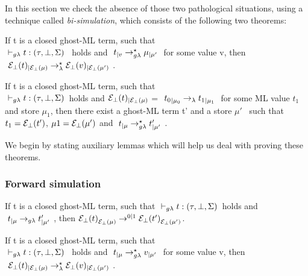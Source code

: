 

In this section we check the absence of those two pathological situations,
using a technique called \textit{bi-simulation}, which consists of 
the following two theorems:

\begin{theorem}
If t is a closed ghost-ML term, such that\\ 
$\typrule{t}{\tau}{\bot}{\Sigma}$ ~holds and $~t_{|v} \rightarrow_{g\lambda}^{\star} \mu_{|\mu'} ~$ 
for some value v, then\\ 
$~\mathcal{E}_{\bot}(t)_{|\mathcal{E}_{\bot}(\mu)} \rightarrow_{\lambda}^{\star} \mathcal{E}_{\bot}(v)_{|\mathcal{E}_{\bot}(\mu')} ~$.
\end{theorem}

\begin{theorem}
If t is a closed ghost-ML term, such that 
\\ $\typrule{t}{\tau}{\bot}{\Sigma}$~holds and 
$\mathcal{E}_{\bot}(t)_{|\mathcal{E}_{\bot}(\mu)}$ = $~{t_0}_{|{\mu_0}} \rightarrow_{\lambda} {t_{1}}_{|\mu_1} ~$ 
for some ML value $t_1$ and store $\mu_1$, 
then there exist a ghost-ML term t' and a store $\mu'$~
such that $t_1 =\mathcal{E}_{\bot}(t')$, $\mu1 = \mathcal{E}_{\bot}(\mu')$ and 
$~t_{|\mu} \rightarrow_{g\lambda}^{\star} t'_{|\mu'} ~$.
\end{theorem}

We begin by stating auxiliary lemmas which will help us deal with proving these theorems.
 
\subsubsection{Forward simulation}

\begin{lemma}
If t is a closed ghost-ML term, such that $\typrule{t}{\tau}{\bot}{\Sigma}$~holds 
and $~t_{|\mu} \rightarrow_{g\lambda} t'_{|\mu'} ~$, then 
${\mathcal{E}_{\bot}(t)}_{\mathcal{E}_{\bot}(\mu)} \rightarrow^{0|1} {\mathcal{E}_{\bot}(t')}_{\mathcal{E}_{\bot}(\mu')}$.
\end{lemma}







\begin{theorem}
If t is a closed ghost-ML term, such that\\ 
$\typrule{t}{\tau}{\bot}{\Sigma}$ ~holds and $~t_{|\mu} \rightarrow_{g\lambda}^{\star} v_{|\mu'} ~$ 
for some value v, then\\ 
$~\mathcal{E}_{\bot}(t)_{|\mathcal{E}_{\bot}(\mu)} \rightarrow_{\lambda}^{\star} \mathcal{E}_{\bot}(v)_{|\mathcal{E}_{\bot}(\mu')} ~$.
\end{theorem}





